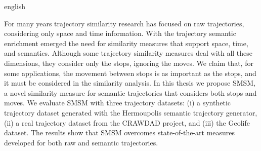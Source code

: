 {
    \begin{otherlanguage*}{english}
    \begin{resumo}[Abstract]

        For many years trajectory similarity research has focused on raw trajectories, considering only space and time information. With the trajectory semantic enrichment emerged the need for similarity measures that support space, time, and semantics. Although some trajectory similarity measures deal with all these dimensions, they consider only the stops, ignoring the moves. We claim that, for some applications, the movement between stops is as important as the stops, and it must be considered in the similarity analysis.
        In this thesis we propose SMSM, a novel similarity measure for semantic trajectories that considers both stops and moves.
        We evaluate SMSM with three trajectory datasets: (i) a synthetic trajectory dataset generated with the Hermoupolis semantic trajectory generator, (ii) a real trajectory dataset from the CRAWDAD project, and (iii) the Geolife dataset. The results show that SMSM overcomes state-of-the-art measures developed for both raw and semantic trajectories.


    \end{resumo}
    \end{otherlanguage*}
}